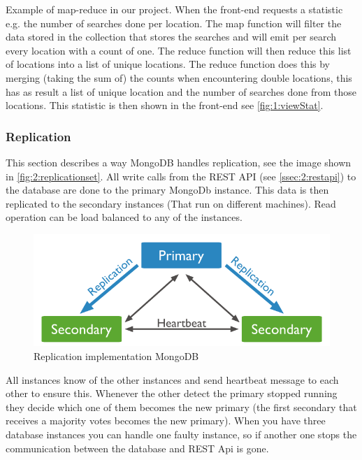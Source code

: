 Example of map-reduce in our project. When the front-end requests a statistic e.g. the number of searches done per location. The map function will filter the data stored in the collection that stores the searches and will emit per search every location with a count of one. The reduce function will then reduce this list of locations into a list of unique locations. The reduce function does this by merging (taking the sum of) the counts when encountering double locations, this has as result a list of unique location and the number of searches done from those locations. This statistic is then shown in the front-end see \autoref{fig:1:viewStat}.

\subsubsection{Replication}
\label{sssec:2:replication}
This section describes a way MongoDB handles replication, see the image shown in \autoref{fig:2:replicationset}. All write calls from the REST API (see \autoref{ssec:2:restapi}) to the database are done to the primary MongoDb instance. This data is then replicated to the secondary instances (That run on different machines). Read operation can be load balanced to any of the instances. 

\begin{figure}
    \includegraphics[width=\textwidth]{./img/replica_set}   
    \caption{Replication implementation MongoDB}
    \label{fig:2:replicationset}
\end{figure}

All instances know of the other instances and send heartbeat message to each other to ensure this. Whenever the other detect the primary stopped running they decide which one of them becomes the new primary (the first secondary that receives a majority votes becomes the new primary). When you have three database instances you can handle one faulty instance, so if another one stops the communication between the database and REST Api is gone. 

